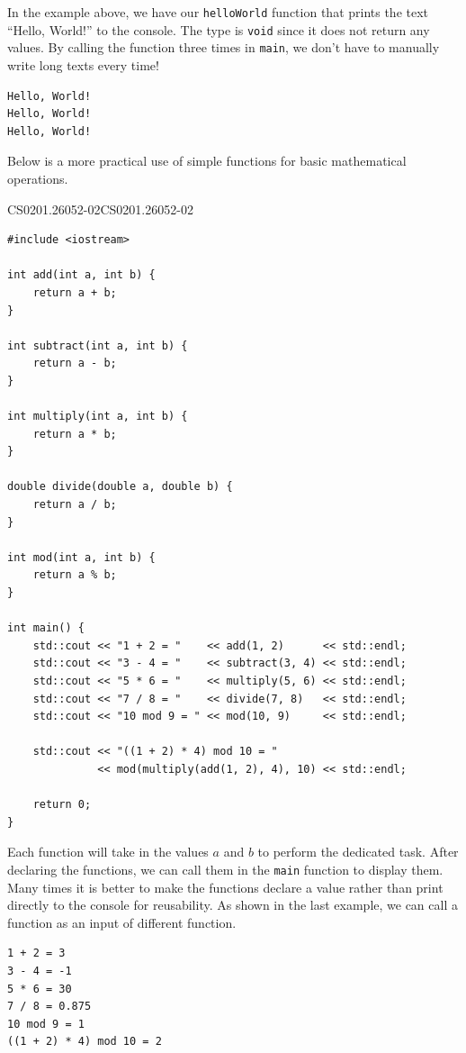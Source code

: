 \documentclass[../../../main.tex]{subfiles}
\begin{document}
In the example above, we have our \verb|helloWorld| function that
prints the text ``Hello, World!'' to the console. The type is
\verb|void| since it does not return any values. By calling the
function three times in \verb|main|, we don't have to manually
write long texts every time!

\begin{outputbox}
\begin{lstlisting}[style=basic]
Hello, World!
Hello, World!
Hello, World!
\end{lstlisting}
\end{outputbox}

Below is a more practical use of simple functions for basic
mathematical operations.

\begin{cppbox}{CS0201.26052-02}{CS0201.26052-02}
\begin{lstlisting}[style=cppstyle]
#include <iostream>

int add(int a, int b) {
    return a + b;
}

int subtract(int a, int b) {
    return a - b;
}

int multiply(int a, int b) {
    return a * b;
}

double divide(double a, double b) {
    return a / b;
}

int mod(int a, int b) {
    return a % b;
}

int main() {
    std::cout << "1 + 2 = "    << add(1, 2)      << std::endl;
    std::cout << "3 - 4 = "    << subtract(3, 4) << std::endl;
    std::cout << "5 * 6 = "    << multiply(5, 6) << std::endl;
    std::cout << "7 / 8 = "    << divide(7, 8)   << std::endl;
    std::cout << "10 mod 9 = " << mod(10, 9)     << std::endl;

    std::cout << "((1 + 2) * 4) mod 10 = "
              << mod(multiply(add(1, 2), 4), 10) << std::endl;

    return 0;
}
\end{lstlisting}
\end{cppbox}

Each function will take in the values $a$ and $b$ to perform the
dedicated task. After declaring the functions, we can call them in
the \verb|main| function to display them. Many times it is better
to make the functions declare a value rather than print directly
to the console for reusability. As shown in the last example,
we can call a function as an input of different function.

\begin{outputbox}
\begin{lstlisting}[style=basic]
1 + 2 = 3
3 - 4 = -1
5 * 6 = 30
7 / 8 = 0.875
10 mod 9 = 1
((1 + 2) * 4) mod 10 = 2
\end{lstlisting}
\end{outputbox}
\end{document}
